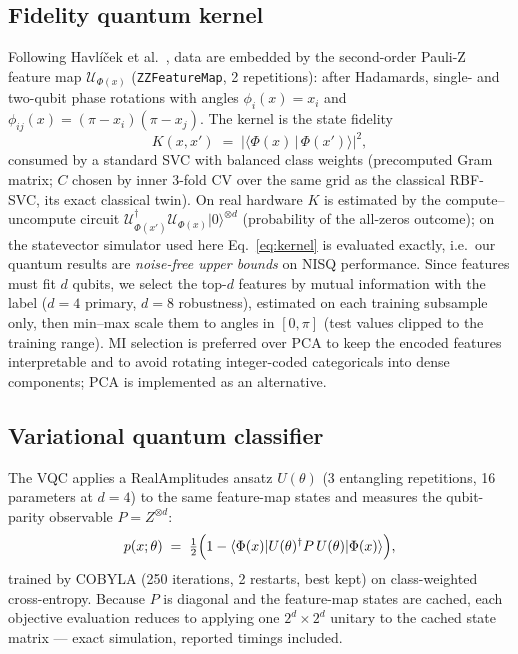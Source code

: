 \documentclass[11pt]{article}
\begin{document}
\subsection{Fidelity quantum kernel}
Following Havl\'i\v{c}ek et al.\ \cite{havlicek2019}, data are embedded by
the second-order Pauli-Z feature map $\mathcal{U}_{\Phi(x)}$
(\texttt{ZZFeatureMap}, 2 repetitions): after Hadamards, single- and
two-qubit phase rotations with angles $\phi_i(x) = x_i$ and $\phi_{ij}(x) =
(\pi - x_i)(\pi - x_j)$. The kernel is the state fidelity
\begin{equation}
K(x, x') \;=\; \bigl|\langle \Phi(x) \,|\, \Phi(x') \rangle\bigr|^2,
\label{eq:kernel}
\end{equation}
consumed by a standard SVC with balanced class weights (precomputed Gram
matrix; $C$ chosen by inner 3-fold CV over the same grid as the classical
RBF-SVC, its exact classical twin). On real hardware $K$ is estimated by the
compute--uncompute circuit
$\mathcal{U}_{\Phi(x')}^{\dagger}\mathcal{U}_{\Phi(x)}|0\rangle^{\otimes d}$
(probability of the all-zeros outcome); on the statevector simulator used
here Eq.~\eqref{eq:kernel} is evaluated exactly, i.e.\ our quantum results
are \emph{noise-free upper bounds} on NISQ performance. Since features must
fit $d$ qubits, we select the top-$d$ features by mutual information with the
label ($d = 4$ primary, $d = 8$ robustness), estimated on each training
subsample only, then min--max scale them to angles in $[0, \pi]$ (test values
clipped to the training range). MI selection is preferred over PCA to keep
the encoded features interpretable and to avoid rotating integer-coded
categoricals into dense components; PCA is implemented as an alternative.

\subsection{Variational quantum classifier}
The VQC applies a RealAmplitudes ansatz $U(\theta)$ (3 entangling
repetitions, 16 parameters at $d = 4$) to the same feature-map
states and measures the qubit-parity observable
$P = Z^{\otimes d}$:
\begin{equation}
p(x;\theta) \;=\; \tfrac{1}{2}\Bigl(1 - \langle\Phi(x)| U(\theta)^{\dagger} P\,
U(\theta) |\Phi(x)\rangle\Bigr),
\label{eq:vqc}
\end{equation}
trained by COBYLA (250 iterations, 2 restarts, best
kept) on class-weighted cross-entropy. Because $P$ is diagonal and the
feature-map states are cached, each objective evaluation reduces to applying
one $2^d \times 2^d$ unitary to the cached state matrix --- exact simulation,
reported timings included.
\end{document}
